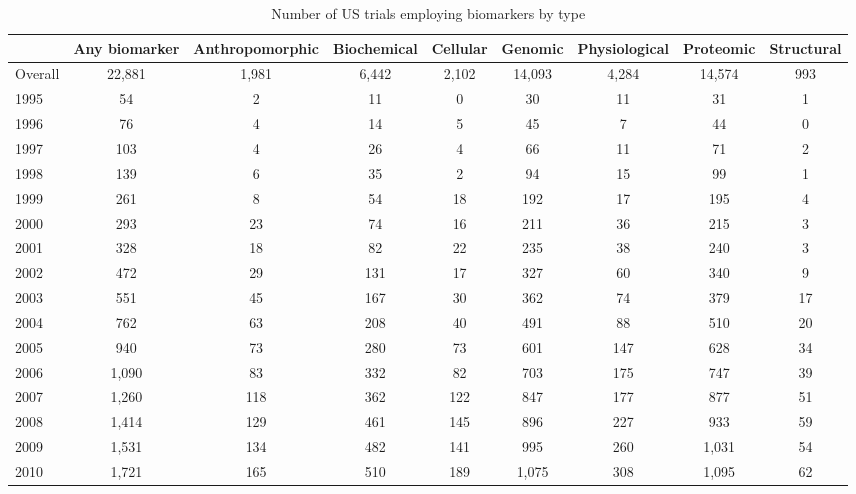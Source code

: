 \begin{table}[htbp]\centering
\caption{Number of US trials employing biomarkers by type}
\begin{tabular}{l*{8}{c}}
\hline\hline
          &Any biomarker&Anthropomorphic&Biochemical& Cellular&  Genomic&Physiological&Proteomic&Structural\\
\hline
Overall   &   22,881&    1,981&    6,442&    2,102&   14,093&    4,284&   14,574&      993\\
1995      &       54&        2&       11&        0&       30&       11&       31&        1\\
1996      &       76&        4&       14&        5&       45&        7&       44&        0\\
1997      &      103&        4&       26&        4&       66&       11&       71&        2\\
1998      &      139&        6&       35&        2&       94&       15&       99&        1\\
1999      &      261&        8&       54&       18&      192&       17&      195&        4\\
2000      &      293&       23&       74&       16&      211&       36&      215&        3\\
2001      &      328&       18&       82&       22&      235&       38&      240&        3\\
2002      &      472&       29&      131&       17&      327&       60&      340&        9\\
2003      &      551&       45&      167&       30&      362&       74&      379&       17\\
2004      &      762&       63&      208&       40&      491&       88&      510&       20\\
2005      &      940&       73&      280&       73&      601&      147&      628&       34\\
2006      &    1,090&       83&      332&       82&      703&      175&      747&       39\\
2007      &    1,260&      118&      362&      122&      847&      177&      877&       51\\
2008      &    1,414&      129&      461&      145&      896&      227&      933&       59\\
2009      &    1,531&      134&      482&      141&      995&      260&    1,031&       54\\
2010      &    1,721&      165&      510&      189&    1,075&      308&    1,095&       62\\

\end{tabular}
\end{table}
